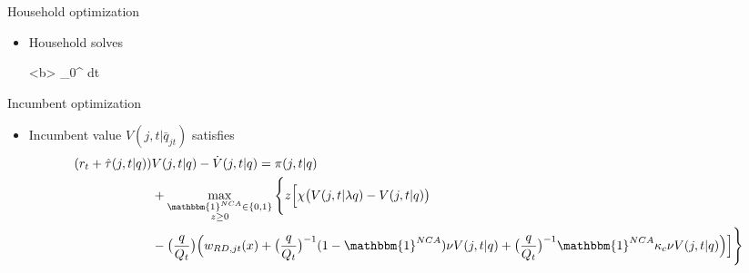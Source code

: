 \documentclass[english,usenames,dvipsnames]{beamer}
\begin{document}
\begin{frame}{Household optimization}\label{household_optimization}
	\hyperlink{closing_the_model}{}
	\begin{itemize}
		\item Household solves
		\tiny
		\begin{maxi*}[1]<b>
			{} { \int_0^{\infty}  dt}{}{}
		\end{maxi*}
	\end{itemize}
\end{frame}


\begin{frame}{Incumbent optimization}\label{HJB_incumbent}
\hyperlink{closing_the_model}{}
\begin{itemize}
\item Incumbent value $V(j,t|\bar{q}_{jt})$ satisfies
\tiny
\begin{align*}
	(r_t + \hat{\tau}(j,t|q)) &V(j,t |q) - \dot{V}(j,t|q) = \pi(j,t|q) \nonumber \\_{}
	&+ \max_{\substack{\mathbbm{1}^{NCA} \in \{0,1\} \\ z \ge 0}} \Bigg\{ z \Big[ \chi \big( V(j,t|\lambda q) - V(j,t|q)\big)  \nonumber \\
	&- \big(\frac{q}{Q_t}\big) \Big( w_{RD,jt}(x) + \big(\frac{q}{Q_t}\big)^{-1} (1-\mathbbm{1}^{NCA}) \nu V(j,t|q) + \big(\frac{q}{Q_t}\big)^{-1}  \mathbbm{1}^{NCA} \kappa_c \nu V(j,t|q) \Big)  \Big] \Bigg\} 
\end{align*}
\end{itemize}
\end{frame}
\end{document}
